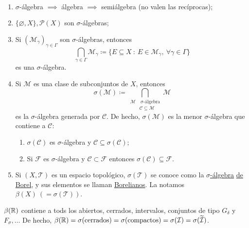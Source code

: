 	\begin{eg}~
		\begin{enumerate}
			\item $\sigma$-álgebra $\implies$ álgebra $\implies$ semiálgebra (no valen las recíprocas);

			\item $\{\varnothing,X\},\mathcal{P}(X)$ son $\sigma$-álgebras;

			\item Si $(\mathscr{M}_{\gamma})_{\gamma \in \Gamma}$ son $\sigma$-álgebras, entonces
			\[ \displaystyle\bigcap_{\gamma\in\Gamma} \mathscr{M}_{\gamma} \coloneq \{ E \subseteq X \ : \ E \in \mathscr{M}_{\gamma},\ \forall \gamma \in \Gamma \} \]
			es una $\sigma$-álgebra.
			
			\item Si $\mathscr{M}$ es una clase de subconjuntos de $X$, entonces
			\[ \sigma(\mathscr{M}) \coloneq \displaystyle\bigcap_{\begin{aligned}
				\mathscr{M}& \ \sigma\text{-álgebra} \\
				& \mathscr{C}\subseteq\mathscr{M}
			\end{aligned}} \mathscr{M} \]
			es la $\sigma$-álgebra generada por $\mathscr{C}$. De hecho, $\sigma(\mathscr{M})$ es la menor $\sigma$-álgebra que contiene a $\mathscr{C}$:
			\begin{enumerate}
				\item $\sigma(\mathscr{C})$ es $\sigma$-álgebra y $\mathscr{C} \subseteq \sigma(\mathscr{C})$;

				\item Si $\mathscr{F}$ es $\sigma$-álgebra y $\mathscr{C} \subset \mathscr{F}$ entonces $\sigma(\mathscr{C}) \subseteq \mathscr{F}$.
			\end{enumerate}

			\item Si $(X,\mathscr{T})$ es un espacio topológico, $\sigma(\mathscr{T})$ se conoce como la \underline{$\sigma$-álgebra} \underline{de Borel}, y sus elementos se llaman \underline{Borelianos}. La notamos $\beta(X)\ (= \sigma(\mathscr{T}))$.
		\end{enumerate}
	\end{eg}
	
	\begin{eg}
		$\beta(\mathbb{R})$ contiene a tods los abiertos, cerrados, intervalos, conjuntos de tipo $G_{\delta}$ y $F_{\sigma},\dots$ De hecho, $\beta(\mathbb{R})=\sigma(\text{cerrados})=\sigma(\text{compactos})=\sigma(\mathcal{I})=\sigma(\widetilde{\mathcal{I}})$.
	\end{eg}

